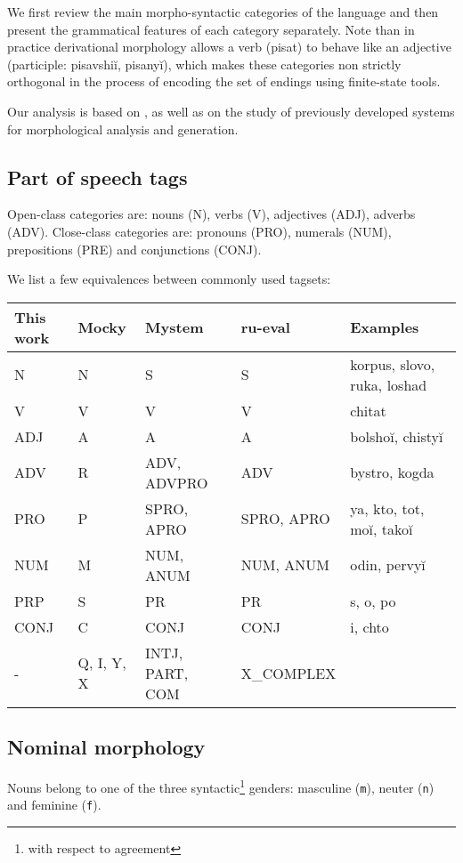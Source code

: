 \documentclass[11pt,letterpaper]{article}
\newcommand\textcyr[1]{{\fontencoding{OT2}\fontfamily{wncyr}\selectfont #1}}
\begin{document}
We first review the main morpho-syntactic categories of the language and then present the grammatical features of each category separately. Note than in practice derivational morphology allows a verb (\textcyr{pisat\cyrsftsn}) to behave like an adjective (participle: \textcyr{pisavshi\u{i}, pisany\u{i}}), which makes these categories non strictly orthogonal in the process of encoding the set of endings using finite-state tools.

Our analysis is based on \cite{timberlake2004}, as well as on the study of previously developed systems for morphological analysis and generation.

\subsection{Part of speech tags}
Open-class categories are: nouns (N), verbs (V), adjectives (ADJ), adverbs (ADV). Close-class categories are: pronouns (PRO), numerals (NUM), prepositions (PRE) and conjunctions (CONJ).

We list a few equivalences between commonly used tagsets:

\begin{center}
\begin{tabular}{lllll}
\toprule
This work & Mocky & Mystem & ru-eval & Examples \\
\midrule
N    & N & S & S & \textcyr{korpus, slovo, ruka, loshad\cyrsftsn}\\
V    & V & V & V & \textcyr{chitat\cyrsftsn} \\
ADJ  & A & A & A & \textcyr{bolsho\u{i}, chisty\u{i}} \\
ADV  & R & ADV, ADVPRO & ADV & \textcyr{bystro, kogda} \\
\midrule
PRO  & P & SPRO, APRO & SPRO, APRO & \textcyr{ya, kto, \cyrerev tot, mo\u{i}, tako\u{i}} \\
NUM  & M & NUM, ANUM & NUM, ANUM & \textcyr{odin, pervy\u{i}} \\
PRP  & S & PR & PR & \textcyr{s, o, po} \\
CONJ & C & CONJ & CONJ & \textcyr{i, chto} \\
   - & Q, I, Y, X & INTJ, PART, COM & X\_COMPLEX \\
\bottomrule
\end{tabular}
\end{center}


\subsection{Nominal morphology}
Nouns belong to one of the three syntactic\footnote{with respect to agreement} genders: masculine (\texttt{m}), neuter (\texttt{n}) and feminine (\texttt{f}).
\end{document}

